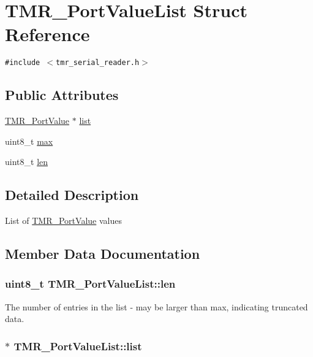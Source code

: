 \hypertarget{struct_t_m_r___port_value_list}{
\section{TMR\_\-PortValueList Struct Reference}
\label{struct_t_m_r___port_value_list}
}
{\tt \#include $<$tmr\_\-serial\_\-reader.h$>$}

\subsection*{Public Attributes}
\begin{CompactItemize}
\item 
\hyperlink{struct_t_m_r___port_value}{TMR\_\-PortValue} $\ast$ \hyperlink{struct_t_m_r___port_value_list_4f842276e90bfdb4dfebd2567357a2f5}{list}
\item 
uint8\_\-t \hyperlink{struct_t_m_r___port_value_list_e8259b764d52286cb65d5e36dc6e7ac1}{max}
\item 
uint8\_\-t \hyperlink{struct_t_m_r___port_value_list_d31b6b728d02fe58e6a6a43acce17e7f}{len}
\end{CompactItemize}


\subsection{Detailed Description}
List of \hyperlink{struct_t_m_r___port_value}{TMR\_\-PortValue} values 

\subsection{Member Data Documentation}
\hypertarget{struct_t_m_r___port_value_list_d31b6b728d02fe58e6a6a43acce17e7f}{
\subsubsection[{len}]{\setlength{\rightskip}{0pt plus 5cm}uint8\_\-t {\bf TMR\_\-PortValueList::len}}}
\label{struct_t_m_r___port_value_list_d31b6b728d02fe58e6a6a43acce17e7f}


The number of entries in the list - may be larger than max, indicating truncated data. \hypertarget{struct_t_m_r___port_value_list_4f842276e90bfdb4dfebd2567357a2f5}{
\subsubsection[{list}]{$\ast$ {\bf TMR\_\-PortValueList::list}}}
\label{struct_t_m_r___port_value_list_4f842276e90bfdb4dfebd2567357a2f5}


